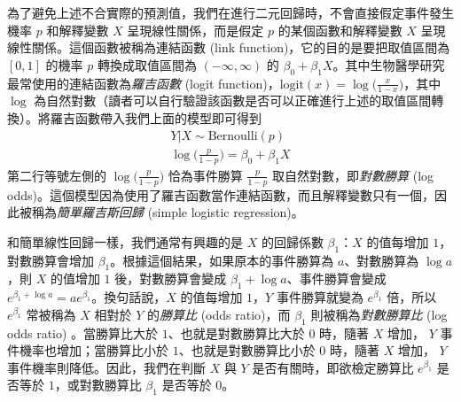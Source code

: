     \medskip

    為了避免上述不合實際的預測值，我們在進行二元回歸時，不會直接假定事件發生機率 $p$ 和解釋變數 $X$ 呈現線性關係，而是假定 $p$ 的某個函數和解釋變數 $X$ 呈現線性關係。這個函數被稱為連結函數 (link function)，它的目的是要把取值區間為 $[0,1]$ 的機率 $p$ 轉換成取值區間為 $(-\infty, \infty)$ 的 $\beta_0 + \beta_1 X$。其中生物醫學研究最常使用的連結函數為\textit{羅吉函數} (logit function)，$\text{logit}(x) = \log\big(\frac{x}{1-x}\big)$，其中 $\log$ 為自然對數（讀者可以自行驗證該函數是否可以正確進行上述的取值區間轉換）。將羅吉函數帶入我們上面的模型即可得到
    \begin{gather*}
        Y|X \sim \text{Bernoulli}(p)\\
        \log\Big(\frac{p}{1-p}\Big) = \beta_0 + \beta_1 X
    \end{gather*}
    第二行等號左側的 $\log\big(\frac{p}{1-p}\big)$ 恰為事件勝算 $\frac{p}{1-p}$ 取自然對數，即\textit{對數勝算} (log odds)。這個模型因為使用了羅吉函數當作連結函數，而且解釋變數只有一個，因此被稱為\textit{簡單羅吉斯回歸} (simple logistic regression)。

    \medskip
        
    和簡單線性回歸一樣，我們通常有興趣的是 $X$ 的回歸係數 $\beta_1$：$X$ 的值每增加 $1$，對數勝算會增加 $\beta_1$。根據這個結果，如果原本的事件勝算為 $a$、對數勝算為 $\log a$，則 $X$ 的值增加 $1$ 後，對數勝算會變成 $\beta_1 + \log a$、事件勝算會變成 $e^{\beta_1 + \log a} = ae^{\beta_1}$。換句話說，$X$ 的值每增加 $1$，$Y$ 事件勝算就變為 $e^{\beta_1}$ 倍，所以 $e^{\beta_1}$ 常被稱為 $X$ 相對於 $Y$ 的\textit{勝算比} (odds ratio)，而 $\beta_1$ 則被稱為\textit{對數勝算比} (log odds ratio) 。當勝算比大於 $1$、也就是對數勝算比大於 $0$ 時，隨著 $X$ 增加， $Y$ 事件機率也增加；當勝算比小於 $1$、也就是對數勝算比小於 $0$ 時，隨著 $X$ 增加， $Y$ 事件機率則降低。因此，我們在判斷 $X$ 與 $Y$ 是否有關時，即欲檢定勝算比 $e^{\beta_1}$ 是否等於 $1$，或對數勝算比 $\beta_1$ 是否等於 $0$。

    \medskip

